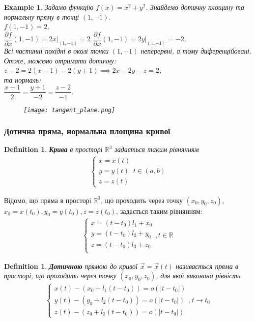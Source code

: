 \documentclass[a4paper, 10pt]{article}
\def\departial#1#2{\dfrac{\partial {#1}}{\partial {#2}}}
\theoremstyle{theoremdd}
\theoremstyle{theoremdd}
\theoremstyle{theoremdd}
\newtheorem{definition}[theorem]{Definition}
\theoremstyle{theoremdd}
\theoremstyle{theoremdd}
\newtheorem{example}[theorem]{Example}
\theoremstyle{theoremdd}
\theoremstyle{theoremdd}
\theoremstyle{theoremdd}
\theoremstyle{theoremdd}
\begin{document}
\begin{example}
Задамо функцію $f(x) = x^2+y^2$. Знайдемо дотичну площину та нормальну пряму в точці $(1,-1)$.\\
$f(1,-1) = 2$.\\
$\departial{f}{x}(1,-1) = 2x \Big|_{(1,-1)} = 2$ \hspace{1cm} $\departial{f}{x}(1,-1) = 2y \Big|_{(1,-1)} = -2$.\\
Всі частинні похідні в околі точки $(1,-1)$ неперервні, а тому диференційовані. Отже, можемо отримати дотичну:\\
$z - 2 = 2(x-1) -2(y+1) \implies 2x-2y-z=2$;\\
та нормаль:\\
$\dfrac{x-1}{2} = \dfrac{y+1}{-2} = \dfrac{z-2}{-1}$.
\begin{figure}[H]
\centering
\texttt{[image: tangent\_plane.png]}
\end{figure}
\end{example}

\subsubsection{Дотична пряма, нормальна площина кривої}
\begin{definition}
\textbf{Крива} в просторі $\mathbb{R}^3$ задається таким рівнянням
\begin{align*}
\begin{cases} x = x(t) \\ y = y(t) \\ z = z(t) \end{cases} t \in (a,b)
\end{align*}
\end{definition}

Відомо, що пряма в просторі $\mathbb{R}^3$, що проходить через точку $(x_0,y_0,z_0)$, $x_0 = x(t_0), y_0 = y(t_0), z = z(t_0)$, задається таким рівнянням:
\begin{align*}
\begin{cases}
x = (t-t_0) l_1 + x_0 \\
y = (t-t_0) l_2 + y_0 \\
z = (t-t_0) l_3 + z_0 \\
\end{cases}, t \in \mathbb{R}
\end{align*}

\begin{definition}
\textbf{Дотичною} прямою до кривої $\vec{x} = \vec{x}(t)$ називається пряма в просторі, що проходить через точку $(x_0,y_0,z_0)$, для якої виконана рівність
\begin{align*}
\begin{cases}
x(t) - (x_0 + l_1(t-t_0)) = o(|t-t_0|) \\
y(t) - (y_0 + l_2(t-t_0)) = o(|t-t_0|) \\
z(t) - (z_0 + l_3(t-t_0)) = o(|t-t_0|)
\end{cases}, t \to t_0
\end{align*}
\end{definition}
\end{document}
